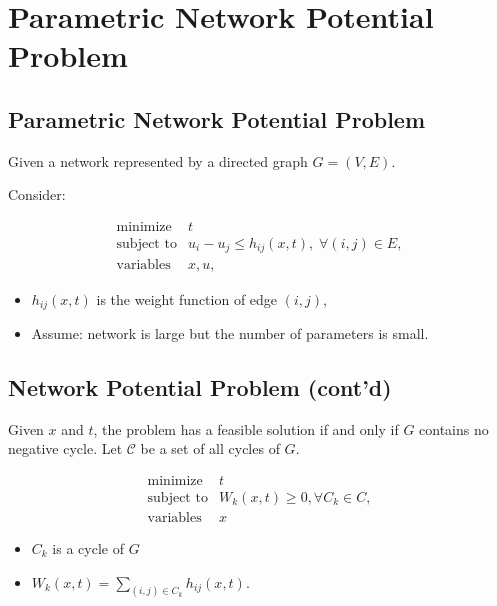 \documentclass[]{article}
\begin{document}
\hypertarget{parametric-network-potential-problem}{%
\section{Parametric Network Potential
Problem}\label{parametric-network-potential-problem}}

\hypertarget{parametric-network-potential-problem-1}{%
\subsection{Parametric Network Potential
Problem}\label{parametric-network-potential-problem-1}}

Given a network represented by a directed graph \(G = (V, E)\).

Consider:

\[\begin{array}{ll}
    \text{minimize} & t \\
    \text{subject to} & u_i - u_j \le h_{ij}(x, t), \; \forall (i, j) \in E ,\\
    \text{variables} &x, u ,
   \end{array}\]

\begin{itemize}
\item
  \(h_{ij}(x, t)\) is the weight function of edge \((i,j)\),
\item
  Assume: network is large but the number of parameters is small.
\end{itemize}

\hypertarget{network-potential-problem-contd}{%
\subsection{Network Potential Problem
(cont'd)}\label{network-potential-problem-contd}}

Given \(x\) and \(t\), the problem has a feasible solution if and only
if \(G\) contains no negative cycle. Let \(\mathcal{C}\) be a set of all
cycles of \(G\).

\[\begin{array}{ll}
    \text{minimize} & t \\
    \text{subject to} & W_k(x, t) \ge 0, \forall C_k \in C ,\\
       \text{variables} & x
   \end{array}\]

\begin{itemize}
\item
  \(C_k\) is a cycle of \(G\)
\item
  \(W_k(x, t) = \sum_{ (i,j)\in C_k} h_{ij}(x, t)\).
\end{itemize}
\end{document}
